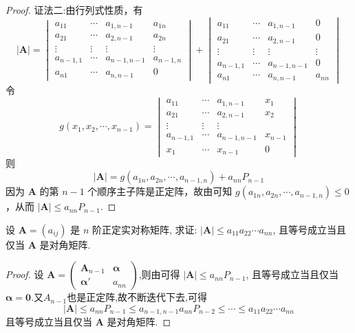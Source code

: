 \documentclass[../../main.tex]{subfiles}%
\begin{document}
\begin{proof}
{\color{blue}证法二:}由行列式性质，有
\[
|\boldsymbol{A}|=\begin{vmatrix}
a_{11}&\cdots&a_{1,n - 1}&a_{1n}\\
a_{21}&\cdots&a_{2,n - 1}&a_{2n}\\
\vdots&\vdots&\vdots&\vdots\\
a_{n - 1,1}&\cdots&a_{n - 1,n - 1}&a_{n - 1,n}\\
a_{n1}&\cdots&a_{n,n - 1}&0
\end{vmatrix}+\begin{vmatrix}
a_{11}&\cdots&a_{1,n - 1}&0\\
a_{21}&\cdots&a_{2,n - 1}&0\\
\vdots&\vdots&\vdots&\vdots\\
a_{n - 1,1}&\cdots&a_{n - 1,n - 1}&0\\
a_{n1}&\cdots&a_{n,n - 1}&a_{nn}
\end{vmatrix}
\]
令
\[
g(x_1,x_2,\cdots,x_{n - 1})=\begin{vmatrix}
a_{11}&\cdots&a_{1,n - 1}&x_1\\
a_{21}&\cdots&a_{2,n - 1}&x_2\\
\vdots&\vdots&\vdots\\
a_{n - 1,1}&\cdots&a_{n - 1,n - 1}&x_{n - 1}\\
x_1&\cdots&x_{n - 1}&0
\end{vmatrix}
\]
则
\[
|\boldsymbol{A}| = g(a_{1n},a_{2n},\cdots,a_{n - 1,n})+a_{nn}P_{n - 1}
\]
因为 \(\boldsymbol{A}\) 的第 \(n - 1\) 个顺序主子阵是正定阵，故由可知 \(g(a_{1n},a_{2n},\cdots,a_{n - 1,n})\leqslant 0\)，从而 \(|\boldsymbol{A}|\leqslant  a_{nn}P_{n - 1}\).
\end{proof}

\begin{corollary}\label{corollary:正定阵的行列式的相关不等式}
设 \(\boldsymbol{A}=(a_{ij})\) 是 \(n\) 阶正定实对称矩阵, 求证: \(|\boldsymbol{A}|\leqslant  a_{11}a_{22}\cdots a_{nn}\), 且等号成立当且仅当 \(\boldsymbol{A}\) 是对角矩阵.
\end{corollary}
\begin{proof}
设 \(\boldsymbol{A}=\begin{pmatrix}\boldsymbol{A}_{n - 1}&\boldsymbol{\alpha}\\\boldsymbol{\alpha}'&a_{nn}\end{pmatrix}\),则由可得 \(|\boldsymbol{A}|\leqslant  a_{nn}P_{n - 1}\), 且等号成立当且仅当 \(\boldsymbol{\alpha}=\boldsymbol{0}\).又$A_{n-1}$也是正定阵,故不断迭代下去,可得
\[|\boldsymbol{A}|\leqslant  a_{nn}P_{n - 1}\leqslant  a_{n - 1,n - 1}a_{nn}P_{n - 2}\leqslant \cdots\leqslant  a_{11}a_{22}\cdots a_{nn}\]
且等号成立当且仅当 \(\boldsymbol{A}\) 是对角矩阵. 
\end{proof}
\end{document}

